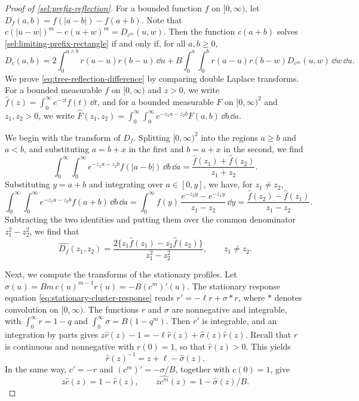 \begin{proof}[Proof of \cref{sel:prefix-reflection}]
For a bounded function $f$ on $[0,\infty)$, let $D_f(a,b)=f(|a-b|)-f(a+b)$. Note that $c(|u-w|)^m-c(u+w)^m=D_{c^m}(u,w)$. Then the function $c(a+b)$ solves \eqref{sel:limiting-prefix-rectangle} if and only if, for all $a,b\ge0$,
\begin{equation}\label{eq:tree-reflection-difference}
 D_c(a,b)=2\int_0^{a\wedge b}r(a-u)r(b-u)\,\dd u
 +B\int_0^a\int_0^b r(a-u)r(b-w)D_{c^m}(u,w)\,\dd w\,\dd u.
\end{equation}
We prove \eqref{eq:tree-reflection-difference} by comparing double Laplace transforms. For a bounded measurable $f$ on $[0,\infty)$ and $z>0$, we write $\widehat f(z)=\int_0^\infty e^{-zt}f(t)\,\dd t$, and for a bounded measurable $F$ on $[0,\infty)^2$ and $z_1,z_2>0$, we write $\widehat F(z_1,z_2)=\int_0^\infty\int_0^\infty e^{-z_1a-z_2b}F(a,b)\,\dd b\,\dd a$.

We begin with the transform of $D_f$. Splitting $[0,\infty)^2$ into the regions $a\ge b$ and $a<b$, and substituting $a=b+x$ in the first and $b=a+x$ in the second, we find
\[
 \int_0^\infty\int_0^\infty e^{-z_1a-z_2b}f(|a-b|)\,\dd b\,\dd a=\frac{\widehat f(z_1)+\widehat f(z_2)}{z_1+z_2}.
\]
Substituting $y=a+b$ and integrating over $a\in[0,y]$, we have, for $z_1\ne z_2$,
\[
 \int_0^\infty\int_0^\infty e^{-z_1a-z_2b}f(a+b)\,\dd b\,\dd a
 =\int_0^\infty f(y)\,\frac{e^{-z_2y}-e^{-z_1y}}{z_1-z_2}\,\dd y
 =\frac{\widehat f(z_2)-\widehat f(z_1)}{z_1-z_2}.
\]
Subtracting the two identities and putting them over the common denominator $z_1^2-z_2^2$, we find that
\begin{equation}\label{eq:tree-laplace-difference}
 \widehat{D_f}(z_1,z_2)=\frac{2\{z_1\widehat f(z_1)-z_2\widehat f(z_2)\}}{z_1^2-z_2^2},\qquad z_1\ne z_2.
\end{equation}

Next, we compute the transforms of the stationary profiles. Let $\sigma(u)=Bm\,c(u)^{m-1}r(u)=-B(c^m)'(u)$. The stationary response equation \eqref{eq:stationary-cluster-response} reads $r'=-\ell r+\sigma*r$, where $*$ denotes convolution on $[0,\infty)$. The functions $r$ and $\sigma$ are nonnegative and integrable, with $\int_0^\infty r=1-q$ and $\int_0^\infty\sigma=B(1-q^m)$. Then $r'$ is integrable, and an integration by parts gives $z\widehat r(z)-1=-\ell\widehat r(z)+\widehat\sigma(z)\widehat r(z)$. Recall that $r$ is continuous and nonnegative with $r(0)=1$, so that $\widehat r(z)>0$. This yields
\begin{equation}\label{eq:tree-laplace-response}
 \widehat r(z)^{-1}=z+\ell-\widehat\sigma(z).
\end{equation}
In the same way, $c'=-r$ and $(c^m)'=-\sigma/B$, together with $c(0)=1$, give
\begin{equation}\label{eq:tree-laplace-correlation}
 z\widehat c(z)=1-\widehat r(z),\qquad z\widehat{c^m}(z)=1-\widehat\sigma(z)/B.
\end{equation}


\end{proof}
